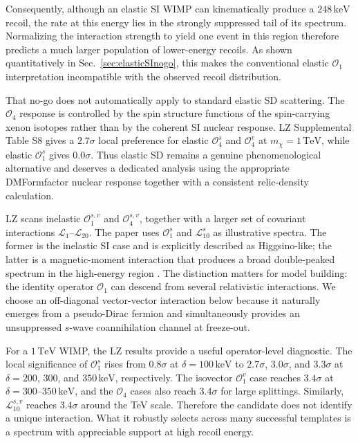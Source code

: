 \documentclass[aps,prd,reprint,superscriptaddress,nofootinbib,longbibliography,floatfix]{revtex4-2}
\newcommand{\TeV}{\mathrm{TeV}}
\newcommand{\keV}{\mathrm{keV}}
\begin{document}
Consequently, although an elastic SI WIMP can kinematically produce a $248\,\keV$ recoil, the rate at this energy lies in the strongly suppressed tail of its spectrum. Normalizing the interaction strength
to yield one event in this region therefore predicts a much larger population of lower-energy recoils. As shown quantitatively in Sec.~\ref{sec:elasticSInogo}, this makes the conventional elastic $\mathcal{O}_1$ interpretation incompatible with the observed recoil distribution.

That no-go does not automatically apply to standard elastic SD scattering. The $\mathcal{O}_4$ response is controlled by the spin structure functions of the spin-carrying xenon isotopes rather than by the coherent SI nuclear response. LZ Supplemental Table S8 gives a $2.7\sigma$ local preference for elastic $\mathcal{O}_4^{s}$ and $\mathcal{O}_4^{v}$ at $m_\chi=1\,\TeV$, while elastic $\mathcal{O}_1^s$ gives $0.0\sigma$. Thus elastic SD remains a genuine phenomenological alternative and deserves a dedicated analysis using the appropriate DMFormfactor nuclear response together with a consistent relic-density calculation.

LZ scans inelastic $\mathcal{O}_1^{s,v}$ and $\mathcal{O}_4^{s,v}$, together with a larger set of covariant interactions $\mathcal{L}_1$--$\mathcal{L}_{20}$. The paper uses $\mathcal{O}_1^s$ and $\mathcal{L}_{10}^s$ as illustrative spectra. The former is the inelastic SI case and is explicitly described as Higgsino-like; the latter is a magnetic-moment interaction that produces a broad double-peaked spectrum in the high-energy region \cite{LZ2026Extended}. The distinction matters for model building: the identity operator $\mathcal{O}_1$ can descend from several relativistic interactions. We choose an off-diagonal vector-vector interaction below because it naturally emerges from a pseudo-Dirac fermion and simultaneously provides an unsuppressed $s$-wave coannihilation channel at freeze-out.

For a $1\,\TeV$ WIMP, the LZ results provide a useful operator-level diagnostic. The local significance of $\mathcal{O}_1^s$ rises from $0.8\sigma$ at $\delta=100\,\keV$ to $2.7\sigma$, $3.0\sigma$, and $3.3\sigma$ at $\delta=200$, $300$, and $350\,\keV$, respectively. The isovector $\mathcal{O}_1^v$ case reaches $3.4\sigma$ at $\delta=300$--$350\,\keV$, and the $\mathcal{O}_4$ cases also reach $3.4\sigma$ for large splittings. Similarly, $\mathcal{L}_{10}^{s,v}$ reaches $3.4\sigma$ around the TeV scale. Therefore the candidate does not identify a unique interaction. What it robustly selects across many successful templates is a spectrum with appreciable support at high recoil energy.
\end{document}
